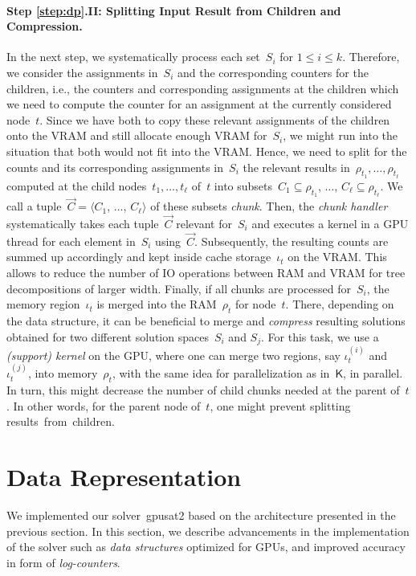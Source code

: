\documentclass{llncs}
\newcommand{\gpusatnu}{{\small\textsf{gpusat2}}\xspace}
\newcommand{\algo}[1]{\ensuremath{\mathsf{#1}}}
\begin{document}
\paragraph*{Step \ref{step:dp}.II: Splitting Input Result from Children
  and Compression.}
%
In the next step, we systematically process each set~$S_i$ for
$1 \leq i \leq k$. Therefore, we consider the assignments in~$S_i$ and
the corresponding counters for the children, i.e., the counters and
corresponding assignments at the children which we need to compute the
counter for an assignment at the currently considered node~$t$.
%
Since we have both to copy these relevant assignments of the children
onto the VRAM and still allocate enough VRAM for~$S_i$, we might
run into the situation that both would not fit into the VRAM.
%
Hence, we need to split for the counts and its corresponding
assignments in~$S_i$ the relevant results
in~$\rho_{t_1}, \ldots, \rho_{t_\ell}$ computed at the child
nodes~$t_1, \ldots, t_{\ell}$ of~$t$ into
subsets~$C_1\subseteq \rho_{t_1}$, $\ldots$,
$C_{\ell} \subseteq \rho_{t_\ell}$.  We call a
tuple~$\vec C=\langle C_1$, $\ldots$, $C_\ell\rangle$ of these subsets
\emph{chunk}.  Then, the \emph{chunk handler} systematically takes
each tuple~$\vec C$ relevant for~$S_i$ and executes a kernel in a GPU
thread for each element in~$S_i$ using~$\vec C$.
%
Subsequently, the resulting counts are summed up accordingly and kept
inside cache storage~$\iota_t$ on the VRAM.
%
This allows to reduce the number of IO operations between RAM and VRAM
for tree decompositions of larger width.
%
Finally, if all chunks are processed for~$S_i$, the memory
region~$\iota_t$ is merged into the RAM~$\rho_t$ for node~$t$.
%
There, depending on the data structure, it can be beneficial to merge
and \emph{compress} resulting solutions obtained for two different
solution spaces~$S_i$ and $S_j$.
For this task, we use a \emph{(support) kernel} on the GPU,
where one can merge two regions, say $\iota^{(i)}_t$ and $\iota^{(j)}_t$,
into memory~$\rho_t$, with the same idea for parallelization as in~\algo{K},
in parallel. In turn, this
might decrease the number of child chunks needed at the parent of~$t$.
%
%
%
In other words, for the parent node of~$t$,
one might prevent splitting results~from~children.

\section{Data Representation}
\label{sec:implementation}
%
We implemented our
solver~\gpusatnu{} %
based on the architecture presented in the previous section.
%
In this section, we describe advancements in the implementation of the
solver such as \emph{data structures} optimized for GPUs, and improved
accuracy in form of \emph{log-counters}.
%
%
\end{document}

